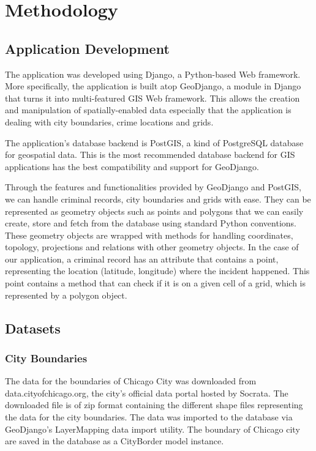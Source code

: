 
\chapter{Methodology}  %


\section{Application Development}
    The application was developed using Django, a Python-based Web framework. More specifically, the application is built atop GeoDjango, a module in Django that turns it into multi-featured GIS Web framework. This allows the creation and manipulation of spatially-enabled data especially that the application is dealing with city boundaries, crime locations and grids.

    The application's database backend is PostGIS, a kind of PostgreSQL database for geospatial data. This is the most recommended database backend for GIS applications has the best compatibility and support for GeoDjango.

    Through the features and functionalities provided by GeoDjango and PostGIS, we can handle criminal records, city boundaries and grids with ease. They can be represented as geometry objects such as points and polygons that we can easily create, store and fetch from the database using standard Python conventions. These geometry objects are wrapped with methods for handling coordinates, topology, projections and relations with other geometry objects. In the case of our application, a criminal record has an attribute that contains a point, representing the location (latitude, longitude) where the incident happened. This point contains a method that can check if it is on a given cell of a grid, which is represented by a polygon object.

\section{Datasets}
    \subsection{City Boundaries}
        The data for the boundaries of Chicago City was downloaded from data.cityofchicago.org, the city's official data portal hosted by Socrata. The downloaded file is of zip format containing the different shape files representing the data for the city boundaries. The data was imported to the database via GeoDjango's LayerMapping data import utility. The boundary of Chicago city are saved in the database as a CityBorder model instance.
